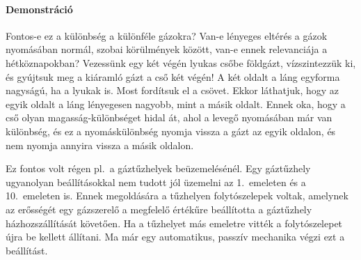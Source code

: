 \documentclass[12pt,a4paper]{scrartcl}
\begin{document}
\footnotesize
\paragraph{Demonstráció}
Fontos-e ez a különbség a különféle gázokra? Van-e lényeges eltérés a gázok nyomásában normál, szobai körülmények között, van-e ennek relevanciája a hétköznapokban? Vezessünk egy két végén lyukas csőbe földgázt, vízszintezzük ki, és gyújtsuk meg a kiáramló gázt a cső két végén! A két oldalt a láng egyforma nagyságú, ha a lyukak is. Most fordítsuk el a csövet. Ekkor láthatjuk, hogy az egyik oldalt a láng lényegesen nagyobb, mint a másik oldalt. Ennek oka, hogy a cső olyan magasság-különbséget hidal át, ahol a levegő nyomásában már van különbség, és ez a nyomáskülönbség nyomja vissza a gázt az egyik oldalon, és nem nyomja annyira vissza a másik oldalon.

Ez fontos volt régen pl.\ a gáztűzhelyek beüzemelésénél. Egy gáztűzhely ugyanolyan beállításokkal nem tudott jól üzemelni az 1.\ emeleten és a 10.\ emeleten is. Ennek megoldására a tűzhelyen folytószelepek voltak, amelynek az erősségét egy gázszerelő a megfelelő értékűre beállította a gáztűzhely házhozszállítását követően. Ha a tűzhelyet más emeletre vitték a folytószelepet újra be kellett állítani. Ma már egy automatikus, passzív mechanika végzi ezt a beállítást.
\normalsize
\end{document}
